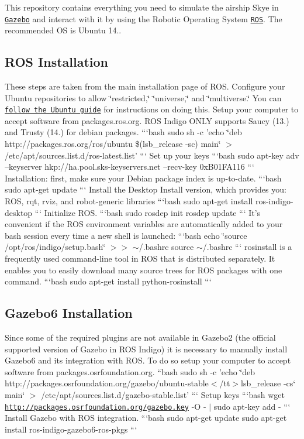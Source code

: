 This repository contains everything you need to simulate the airship Skye in \href{http://gazebosim.org/}{\tt Gazebo} and interact with it by using the Robotic Operating System \href{http://www.ros.org/}{\tt R\-O\-S}. The recommended O\-S is Ubuntu 14..

\subsection*{R\-O\-S Installation}

These steps are taken from the main installation page of R\-O\-S. Configure your Ubuntu repositories to allow \char`\"{}restricted,\char`\"{} \char`\"{}universe,\char`\"{} and \char`\"{}multiverse.\char`\"{} You can \href{https://help.ubuntu.com/community/Repositories/Ubuntu}{\tt follow the Ubuntu guide} for instructions on doing this. Setup your computer to accept software from packages.\-ros.\-org. R\-O\-S Indigo O\-N\-L\-Y supports Saucy (13.) and Trusty (14.) for debian packages. ```bash sudo sh -\/c 'echo \char`\"{}deb http\-://packages.\-ros.\-org/ros/ubuntu \$(lsb\-\_\-release -\/sc) main\char`\"{} $>$ /etc/apt/sources.list.\-d/ros-\/latest.list' ``` Set up your keys ```bash sudo apt-\/key adv --keyserver hkp\-://ha.pool.\-sks-\/keyservers.\-net --recv-\/key 0x\-B01\-F\-A116 ``` Installation\-: first, make sure your Debian package index is up-\/to-\/date. ```bash sudo apt-\/get update ``` Install the Desktop Install version, which provides you\-: R\-O\-S, rqt, rviz, and robot-\/generic libraries ```bash sudo apt-\/get install ros-\/indigo-\/desktop ``` Initialize R\-O\-S. ```bash sudo rosdep init rosdep update ``` It's convenient if the R\-O\-S environment variables are automatically added to your bash session every time a new shell is launched\-: ```bash echo \char`\"{}source /opt/ros/indigo/setup.\-bash\char`\"{} $>$$>$ $\sim$/.bashrc source $\sim$/.bashrc ``` rosinstall is a frequently used command-\/line tool in R\-O\-S that is distributed separately. It enables you to easily download many source trees for R\-O\-S packages with one command. ```bash sudo apt-\/get install python-\/rosinstall ``` \subsection*{Gazebo6 Installation}

Since some of the required plugins are not available in Gazebo2 (the official supported version of Gazebo in R\-O\-S Indigo) it is necessary to manually install Gazebo6 and its integration with R\-O\-S. To do so setup your computer to accept software from packages.\-osrfoundation.\-org. ``{\ttfamily bash sudo sh -\/c 'echo \char`\"{}deb http\-://packages.\-osrfoundation.\-org/gazebo/ubuntu-\/stable$<$/tt$>$lsb\-\_\-release -\/cs` main\char`\"{} $>$ /etc/apt/sources.list.\-d/gazebo-\/stable.list' ``` Setup keys ```bash wget \href{http://packages.osrfoundation.org/gazebo.key}{\tt http\-://packages.\-osrfoundation.\-org/gazebo.\-key} -\/\-O -\/ $\vert$ sudo apt-\/key add -\/ ``` Install Gazebo with R\-O\-S integration. ```bash sudo apt-\/get update sudo apt-\/get install ros-\/indigo-\/gazebo6-\/ros-\/pkgs ```}

